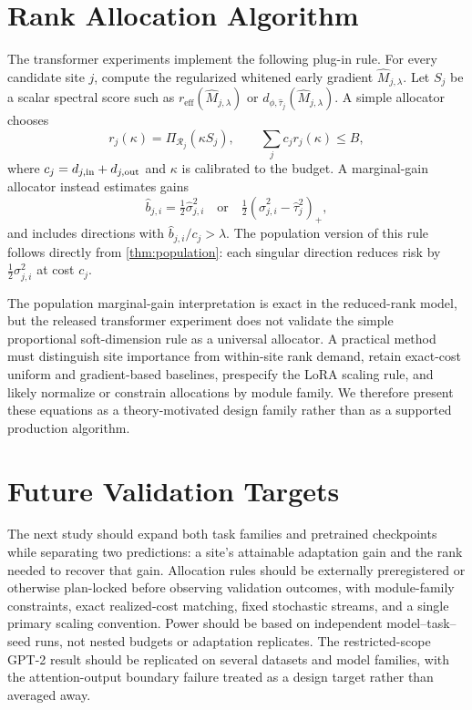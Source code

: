 \documentclass[10pt,twocolumn]{article}
\theoremstyle{definition}
\newcommand{\half}{\tfrac12}
\newcommand{\Mhat}{\widehat M}
\newcommand{\eff}{\mathrm{eff}}
\begin{document}
\section{Rank Allocation Algorithm}
\label{sec:algorithm}

The transformer experiments implement the following plug-in rule.  For every candidate site $j$, compute the regularized whitened early gradient $\Mhat_{j,\lambda}$.  Let $S_j$ be a scalar spectral score such as $r_{\eff}(\Mhat_{j,\lambda})$ or $d_{\phi,\widehat\tau_j}(\Mhat_{j,\lambda})$.  A simple allocator chooses
\begin{equation}
    r_j(\kappa)=\Pi_{\mathcal R_j}(\kappa S_j),
    \qquad
    \sum_j c_jr_j(\kappa)\le B,
\end{equation}
where $c_j=d_{j,{\rm in}}+d_{j,{\rm out}}$ and $\kappa$ is calibrated to the budget.  A marginal-gain allocator instead estimates gains
\begin{equation}
    \widehat b_{j,i}=\half\widehat\sigma_{j,i}^2
    \quad\text{or}\quad
    \half(\widehat\sigma_{j,i}^2-\widehat\tau_j^2)_+,
\end{equation}
and includes directions with $\widehat b_{j,i}/c_j>\lambda$.  The population version of this rule follows directly from \cref{thm:population}: each singular direction reduces risk by $\half\sigma_{j,i}^2$ at cost $c_j$.

The population marginal-gain interpretation is exact in the reduced-rank model, but the released transformer experiment does not validate the simple proportional soft-dimension rule as a universal allocator.  A practical method must distinguish site importance from within-site rank demand, retain exact-cost uniform and gradient-based baselines, prespecify the LoRA scaling rule, and likely normalize or constrain allocations by module family.  We therefore present these equations as a theory-motivated design family rather than as a supported production algorithm.

\section{Future Validation Targets}
\label{sec:next-validation}

The next study should expand both task families and pretrained checkpoints while separating two predictions: a site's attainable adaptation gain and the rank needed to recover that gain.  Allocation rules should be externally preregistered or otherwise plan-locked before observing validation outcomes, with module-family constraints, exact realized-cost matching, fixed stochastic streams, and a single primary scaling convention.  Power should be based on independent model--task--seed runs, not nested budgets or adaptation replicates.  The restricted-scope GPT-2 result should be replicated on several datasets and model families, with the attention-output boundary failure treated as a design target rather than averaged away.
\end{document}
